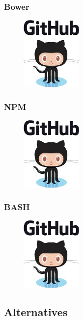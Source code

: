 \subsubsection{Bower}
\begin{figure}
\includegraphics[width=3cm]{img/zf2/github-logo.png}
\end{figure} 


\subsubsection{NPM}
\begin{figure}
\includegraphics[width=3cm]{img/zf2/github-logo.png}
\end{figure} 


\subsubsection{BASH}
\begin{figure}
\includegraphics[width=3cm]{img/zf2/github-logo.png}
\end{figure} 

\subsection{Alternatives}
